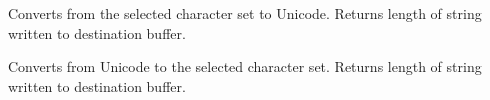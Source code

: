 

\label{wxcsconvmb2wc}


Converts from the selected character set to Unicode. Returns length of string written to destination buffer.


\label{wxcsconvwc2mb}


Converts from Unicode to the selected character set. Returns length of string written to destination buffer.

